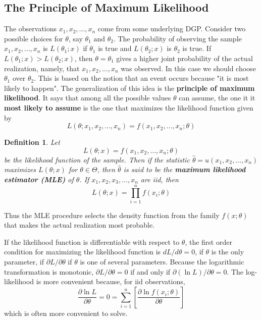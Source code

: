 \documentclass{article}
\newtheorem{definition}{Definition}[section]
\begin{document}
\subsection{The Principle of Maximum Likelihood}

The observations \(x_1,x_2,\dots,x_n\) come from some underlying DGP. Consider two possible choices for \(\theta\), say \(\theta_1 \text{ and } \theta_2\). The probability of observing the sample \(x_1,x_2,\dots,x_n\) is \(L(\theta_1;x)\) if \(\theta_1\) is true and \(L(\theta_2;x)\) is \(\theta_2\) is true. If \(L(\theta_1;x) > L(\theta_2;x)\), then \(\theta=\theta_1\) gives a higher joint probability of the actual realization, namely, that \(x_1,x_2,\dots,x_n\) was observed. In this case we should choose \(\theta_1\) over \(\theta_2\). This is based on the notion that an event occurs because "it is most likely to happen". The generalization of this idea is the \textbf{principle of maximum likelihood}. It says that among all the possible values \(\theta\) can assume, the one it it \textbf{most likely to assume} is the one that maximizes the likelihood function given by
\begin{equation*}
L(\theta;x_1,x_2,\dots,x_n)=f(x_1,x_2,\dots,x_n;\theta)
\end{equation*}

\begin{definition}
    Let
    \begin{equation*}
        L(\theta;x)=f(x_1,x_2,\dots,x_n;\theta)
    \end{equation*}
    be the likelihood function of the sample. Then if the statistic \(\hat{\theta}=u(x_1,x_2,\dots,x_n)\) maximizes \(L(\theta;x)\) for \(\theta \in \Theta\), then \(\hat{\theta}\) is said to be the \textbf{maximum likelihood estimator (MLE)} of \(\theta\). If \(x_1,x_2,x_3,\dots,x_n\) are iid, then
    \begin{equation*}
        L(\theta;x)=\prod_{i=1}^{n} f(x_i;\theta)
    \end{equation*}
    \end{definition}

Thus the MLE procedure selects the density function from the family \(f(x;\theta)\) that makes the actual realization most probable.

If the likelihood function is differentiable with respect to \(\theta\), the first order condition for maximizing the likelihood function is \(dL/d\theta=0\), if \(\theta\) is the only parameter, if \(\partial L/\partial \theta\) if \(\theta\) is one of several parameters. Because the logarithmic transformation is monotonic, \(\partial L/\partial \theta=0\) if and only if \(\partial(\ln L)/\partial \theta=0\). The log-likelihood is more convenient because, for iid observations,
\begin{equation*}
    \frac{\partial \ln L}{\partial \theta}=0=\sum_{i=1}^n \left[\frac{\partial \ln{f(x_i;\theta)}}{\partial \theta} \right]
\end{equation*}
which is often more convenient to solve.
\end{document}

